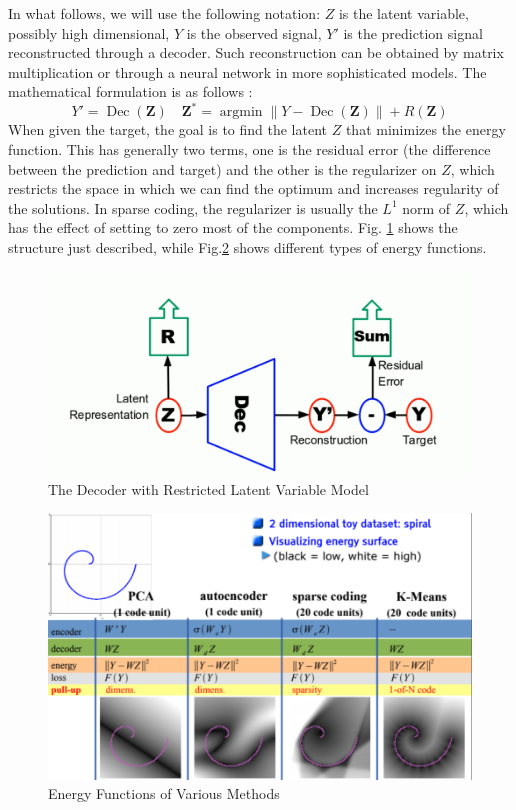 In what follows, we will use the following notation: $Z$ is the latent variable, possibly high dimensional, $Y$ is the observed signal, $Y'$ is the prediction signal reconstructed through a decoder. Such reconstruction can be obtained by matrix multiplication or through a neural network in more sophisticated models. The mathematical formulation is as follows : 
\[Y'=\operatorname{Dec}(\mathbf{Z}) \quad \mathbf{Z}^{*}=\operatorname{argmin}\|Y-\operatorname{Dec}(\mathbf{Z})\|+R(\mathbf{Z})\]
When given the target, the goal is to find the latent $Z$ that minimizes the energy function. This has generally two terms, one is the residual error (the difference between the prediction and target) and the other is the regularizer on $Z$, which restricts the space in which we can find the optimum and increases regularity of the solutions. In sparse coding, the regularizer is usually the $L^1$ norm of $Z$, which has the effect of setting to zero most of the components. Fig. \ref{fig:decoder} shows the structure just described, while Fig.\ref{fig:energy} shows different types of energy functions.
\begin{figure}[H]
\centering
\includegraphics[width=1.0\linewidth]{lectures/12-a/decoder.png}
\caption{The Decoder with Restricted Latent Variable Model}
\label{fig:decoder}
\end{figure}
\begin{figure}[H]
\centering
\includegraphics[width=0.8\linewidth]{lectures/12-a/ernergy.png}
\caption{Energy Functions of Various Methods}

\label{fig:energy}
\end{figure}
